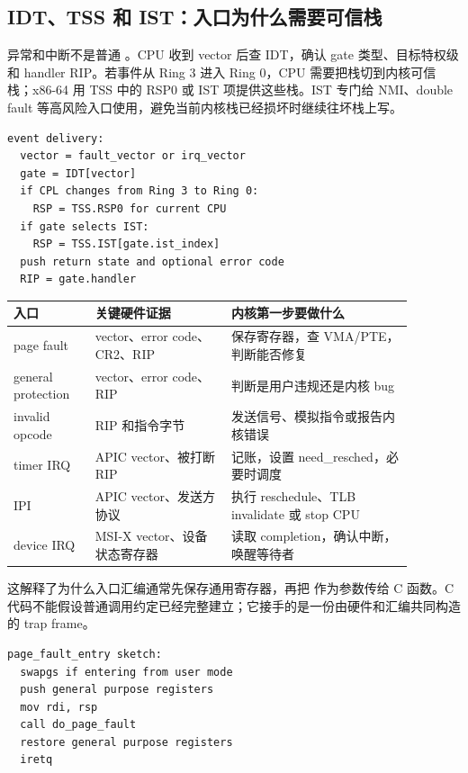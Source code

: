 \subsection{IDT、TSS 和 IST：入口为什么需要可信栈}

异常和中断不是普通 。CPU 收到 vector 后查 IDT，确认 gate 类型、目标特权级和 handler RIP。若事件从 Ring 3 进入 Ring 0，CPU 需要把栈切到内核可信栈；x86-64 用 TSS 中的 RSP0 或 IST 项提供这些栈。IST 专门给 NMI、double fault 等高风险入口使用，避免当前内核栈已经损坏时继续往坏栈上写。

\begin{lstlisting}
event delivery:
  vector = fault_vector or irq_vector
  gate = IDT[vector]
  if CPL changes from Ring 3 to Ring 0:
    RSP = TSS.RSP0 for current CPU
  if gate selects IST:
    RSP = TSS.IST[gate.ist_index]
  push return state and optional error code
  RIP = gate.handler
\end{lstlisting}

\begin{longtable}{p{0.18\linewidth}p{0.30\linewidth}p{0.40\linewidth}}
\toprule
入口 & 关键硬件证据 & 内核第一步要做什么 \\
\midrule
page fault & vector、error code、CR2、RIP & 保存寄存器，查 VMA/PTE，判断能否修复 \\
general protection & vector、error code、RIP & 判断是用户违规还是内核 bug \\
invalid opcode & RIP 和指令字节 & 发送信号、模拟指令或报告内核错误 \\
timer IRQ & APIC vector、被打断 RIP & 记账，设置 need\_resched，必要时调度 \\
IPI & APIC vector、发送方协议 & 执行 reschedule、TLB invalidate 或 stop CPU \\
device IRQ & MSI-X vector、设备状态寄存器 & 读取 completion，确认中断，唤醒等待者 \\
\bottomrule
\end{longtable}

这解释了为什么入口汇编通常先保存通用寄存器，再把  作为参数传给 C 函数。C 代码不能假设普通调用约定已经完整建立；它接手的是一份由硬件和汇编共同构造的 trap frame。

\begin{lstlisting}
page_fault_entry sketch:
  swapgs if entering from user mode
  push general purpose registers
  mov rdi, rsp
  call do_page_fault
  restore general purpose registers
  iretq
\end{lstlisting}

